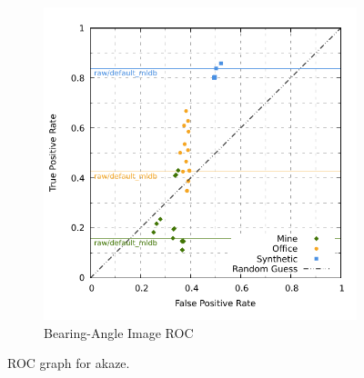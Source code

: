 \begin{figure}[H]
\begin{subfigure}[t]{0.45\linewidth}
    \includegraphics[width=\linewidth]{chapter06/results/AKAZE/bearing/roc.pdf}
    \caption{Bearing-Angle Image ROC}
\end{subfigure}
    \caption{ROC graph for \acrshort{akaze}.}\label{fig:roc_akaze}
\end{figure}
